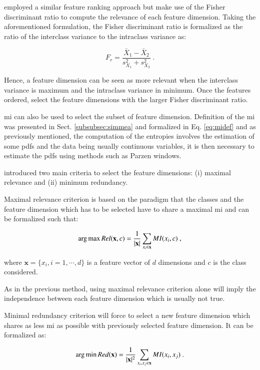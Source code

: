\cite{Vos2012} employed a similar feature ranking approach but make use of the Fisher discriminant ratio to compute the relevance of each feature dimension. Taking the aforementioned formulation, the Fisher discriminant ratio is formalized as the ratio of the interclass variance to the intraclass variance as:

\begin{equation}
F_r = \frac{\bar{X}_1 - \bar{X}_2}{s^{2}_{X_1}+s^{2}_{X_2}} \ .
\label{eq:fisherratio}
\end{equation}

Hence, a feature dimension can be seen as more relevant when the interclass variance is maximum and the intraclass variance in minimum. Once the features ordered, \cite{Vos2012} select the feature dimensions with the larger Fisher discriminant ratio.

\ac{mi} can also be used to select the subset of feature dimension. Definition of the \ac{mi} was presented in Sect. \ref{subsubsec:simmea} and formalized in Eq. \eqref{eq:midef} and as previously mentioned, the computation of the entropies involves the estimation of some \acp{pdf} and the data being usually continuous variables, it is then necessary to estimate the \acp{pdf} using methods such as Parzen windows.

\cite{Peng2005} introduced two main criteria to select the feature dimensions: (i) maximal relevance and (ii) minimum redundancy.

Maximal relevance criterion is based on the paradigm that the classes and the feature dimension which has to be selected have to share a maximal \ac{mi} and can be formalized such that:

\begin{equation}
	\operatorname*{arg\,max} Rel(\mathbf{x},c) = \frac{1}{|\mathbf{x}|} \sum_{x_i \in \mathbf{x}} MI(x_i,c)  \ , 
	\label{eq:mRel}
\end{equation}

\noindent where $\mathbf{x} = \{x_i,i=1,\cdots,d\}$ is a feature vector of $d$ dimensions and $c$ is the class considered.

As in the previous method, using maximal relevance criterion alone will imply the independence between each feature dimension which is usually not true.

Minimal redundancy criterion will force to select a new feature dimension which shares as less \ac{mi} as possible with previously selected feature dimension. It can be formalized as:

\begin{equation}
	\operatorname*{arg\,min} Red(\mathbf{x}) = \frac{1}{|\mathbf{x}|^2} \sum_{x_i,x_j \in \mathbf{x}} MI(x_i,x_j)  \ . 
	\label{eq:mRed}
\end{equation}

